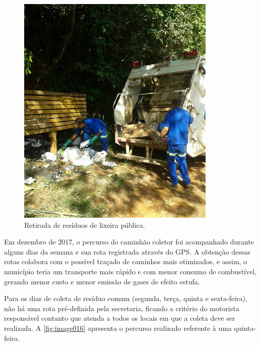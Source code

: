 	\begin{figure}
		\centering
		\includegraphics[width=0.50\linewidth]{produtos/prodtres/image015}
		\caption{Retirada de resíduos de lixeira pública.}
		\label{fig:image015}
	\end{figure}
	
	Em dezembro de 2017, o percurso do caminhão coletor foi acompanhado durante alguns dias da semana e sua rota registrada através do GPS. A obtenção dessas rotas colabora com o possível traçado de caminhos mais otimizados, e assim, o município teria um transporte mais rápido e com menor consumo de combustível, gerando menor custo e menor emissão de gases de efeito estufa.
	
	Para os dias de coleta de resíduo comum (segunda, terça, quinta e sexta-feira), não há uma rota pré-definida pela secretaria, ficando a critério do motorista responsável contanto que atenda a todos os locais em que a coleta deve ser realizada. A \autoref{fig:image016} apresenta o percurso realizado referente à uma quinta-feira.
	
